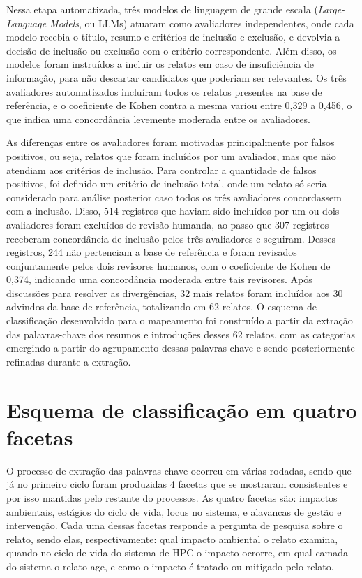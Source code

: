 Nessa etapa automatizada, três modelos de linguagem de grande escala (\textit{Large-Language Models}, ou LLMs)
atuaram como avaliadores independentes, onde cada modelo recebia o título, resumo e critérios de inclusão e exclusão,
e devolvia a decisão de inclusão ou exclusão com o critério correspondente. Além disso, os modelos foram instruídos 
a incluir os relatos em caso de insuficiência de informação, para não descartar candidatos que poderiam ser relevantes.
Os três avaliadores automatizados incluíram todos os relatos presentes na base de referência, e o coeficiente de
Kohen contra a mesma variou entre 0,329 a 0,456, o que indica uma concordância levemente moderada entre os avaliadores.

As diferenças entre os avaliadores foram motivadas principalmente por falsos positivos, ou seja, relatos que 
foram incluídos por um avaliador, mas que não atendiam aos critérios de inclusão. Para controlar a quantidade
de falsos positivos, foi definido um critério de inclusão total, onde um relato só seria considerado para análise
posterior caso todos os três avaliadores concordassem com a inclusão. Disso, 514 registros que haviam sido incluídos
por um ou dois avaliadores foram excluídos de revisão humanda, ao passo que 307 registros receberam concordância
de inclusão pelos três avaliadores e seguiram. Desses registros, 244 não pertenciam a base de referência e 
foram revisados conjuntamente pelos dois revisores humanos, com o coeficiente de Kohen de 0,374, indicando uma
concordância moderada entre tais revisores. Após discussões para resolver as divergências, 32 mais relatos foram 
incluídos aos 30 advindos da base de referência, totalizando em 62 relatos. O esquema de classificação desenvolvido
para o mapeamento foi construído a partir da extração das palavras-chave dos resumos e introduções desses 62 relatos,
com as categorias emergindo a partir do agrupamento dessas palavras-chave e sendo posteriormente refinadas
durante a extração. 

\section{Esquema de classificação em quatro facetas}

O processo de extração das palavras-chave ocorreu em várias rodadas, sendo que já no primeiro ciclo foram produzidas
4 facetas que se mostraram consistentes e por isso mantidas pelo restante do processos. As quatro facetas são:
impactos ambientais, estágios do ciclo de vida, locus no sistema, e alavancas de gestão e intervenção. Cada uma
dessas facetas responde a pergunta de pesquisa sobre o relato, sendo elas, respectivamente: qual impacto ambiental
o relato examina, quando no ciclo de vida do sistema de HPC o impacto ocrorre, em qual camada do sistema o relato age,
e como o impacto é tratado ou mitigado pelo relato. 

